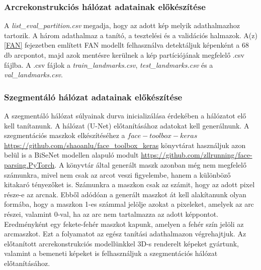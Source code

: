 \documentclass[12pt,a4]{article}
\begin{document}
            \subsubsection{Arcrekonstrukciós hálózat adatainak előkészítése}

            A \textit{list\_eval\_partition.csv} megadja, hogy az adott kép melyik adathalmazhoz tartozik.
           A három adathalmaz a tanító, a tesztelési és a validációs halmazok. A(z) \ref{FAN} fejezetben említett FAN modellt felhasználva detektáljuk képenként a 68 db arcpontot, majd azok mentésre kerülnek a kép partíciójának megfelelő .csv fájlba. A .csv fájlok a \textit{train\_landmarks.csv}, \textit{test\_landmarks.csv} és a \textit{val\_landmarks.csv}.

            \subsubsection{Szegmentáló hálózat adatainak előkészítése}

             A szegmentáló hálózat súlyainak durva inicializálása érdekében a hálózatot elő kell tanítanunk. A hálózat (U-Net) előtanításához adatokat kell generálnunk. A szegmentációs maszkok elkészítéséhez a $face-toolbox-keras$ \url{https://github.com/shaoanlu/face_toolbox_keras} könyvtárat használjuk azon belül is a BiSeNet modellen alapuló modult \url{https://github.com/zllrunning/face-parsing.PyTorch}. A könyvtár által generált maszk azonban még nem megfelelő számunkra, mivel nem csak az arcot veszi figyelembe, hanem a különböző kitakaró tényezőket is. Számunkra a maszkon csak az számit, hogy az adott pixel része-e az arcnak. Ebből adódóan a generált maszkot át kell alakítanunk olyan formába, hogy a maszkon 1-es számmal jelölje azokat a pixeleket, amelyek az arc részei, valamint 0-val, ha az arc nem tartalmazza az adott képpontot. Eredményként egy fekete-fehér maszkot kapunk, amelyen a fehér szín jelöli az arcmaszkot. Ezt a folyamatot az egész tanítási adathalmazon végrehajtjuk. 
             Az előtanított arcrekonstrukciós modellünkkel 3D-s renderelt képeket gyártunk, valamint a bemeneti képeket is felhasználjuk a szegmentációs hálózat előtanításához.
\end{document}
